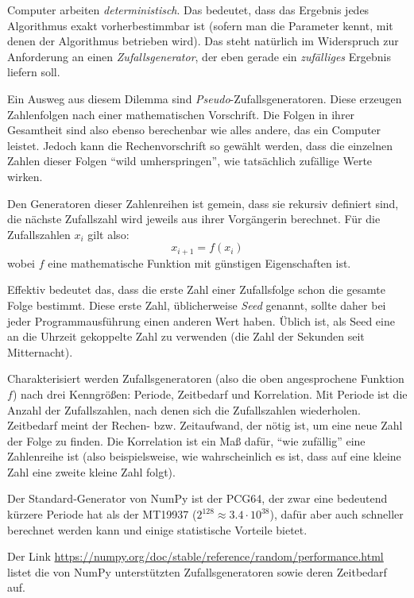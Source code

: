 \begin{hintbox}[Zufallsgeneratoren]
Computer arbeiten \emph{deterministisch}. Das bedeutet, dass das Ergebnis jedes Algorithmus exakt vorherbestimmbar ist (sofern man die Parameter kennt, mit denen der Algorithmus betrieben wird). Das steht natürlich im Widerspruch zur Anforderung an einen \emph{Zufallsgenerator}, der eben gerade ein \emph{zufälliges} Ergebnis liefern soll.

Ein Ausweg aus diesem Dilemma sind \emph{Pseudo}-Zufallsgeneratoren. Diese erzeugen Zahlenfolgen nach einer mathematischen Vorschrift. Die Folgen in ihrer Gesamtheit sind also ebenso berechenbar wie alles andere, das ein Computer leistet. Jedoch kann die Rechenvorschrift so gewählt werden, dass die einzelnen Zahlen dieser Folgen \enquote{wild umherspringen}, \ie wie tatsächlich zufällige Werte wirken.

Den Generatoren dieser Zahlenreihen ist gemein, dass sie rekursiv definiert sind, \ie die nächste Zufallszahl wird jeweils aus ihrer Vorgängerin berechnet. Für die Zufallszahlen $x_i$ gilt also:
\[ x_{i+1} = f(x_i) \]
wobei $f$ eine mathematische Funktion mit günstigen Eigenschaften ist.

Effektiv bedeutet das, dass die erste Zahl einer Zufallsfolge schon die gesamte Folge bestimmt. Diese erste Zahl, üblicherweise \emph{Seed} genannt, sollte daher bei jeder Programmausführung einen anderen Wert haben. Üblich ist, als Seed eine an die Uhrzeit gekoppelte Zahl zu verwenden (\eg die Zahl der Sekunden seit Mitternacht).

Charakterisiert werden Zufallsgeneratoren (also die oben angesprochene Funktion $f$) nach drei Kenngrößen: Periode, Zeitbedarf und Korrelation. Mit Periode ist die Anzahl der Zufallszahlen, nach denen sich die Zufallszahlen wiederholen. Zeitbedarf meint der Rechen- bzw. Zeitaufwand, der nötig ist, um eine neue Zahl der Folge zu finden. Die Korrelation ist ein Maß dafür, \enquote{wie zufällig} eine Zahlenreihe ist (also beispielsweise, wie wahrscheinlich es ist, dass auf eine kleine Zahl eine zweite kleine Zahl folgt).
\end{hintbox}

Der Standard-Generator von NumPy ist der PCG64, der zwar eine bedeutend kürzere Periode hat als der MT19937 ($2^{128} \approx 3.4 \cdot 10^{38}$), dafür aber auch schneller berechnet werden kann und einige statistische Vorteile bietet.

Der Link \url{https://numpy.org/doc/stable/reference/random/performance.html} listet die von NumPy unterstützten Zufallsgeneratoren sowie deren Zeitbedarf auf.

